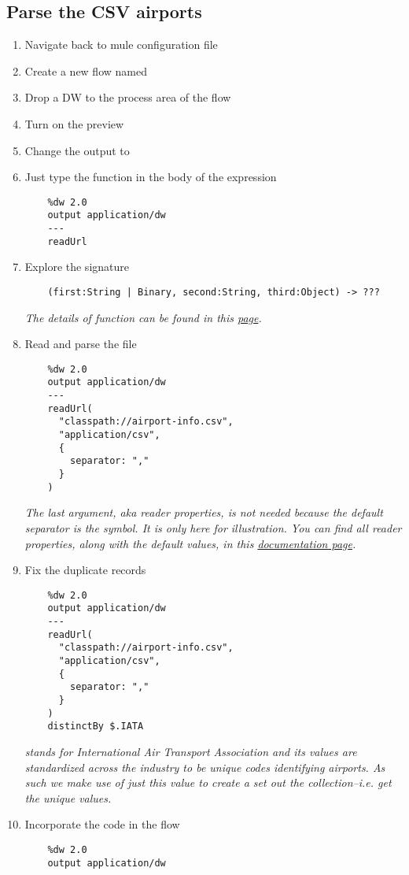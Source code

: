 \subsection{Parse the CSV airports}
\begin{enumerate}[resume*]
\item Navigate back to  mule configuration file
\item Create a new flow named 
\item Drop a DW to the process area of the flow
\item Turn on the preview
\item Change the output to 
\item Just type the function  in the body of the expression
  \begin{verbatim}
    %dw 2.0
    output application/dw
    ---
    readUrl
  \end{verbatim}
\item Explore the signature
  \begin{verbatim}
    (first:String | Binary, second:String, third:Object) -> ???
  \end{verbatim}
  \emph{
    The details of  function can be found in this \href{https://docs.mulesoft.com/mule-runtime/4.3/dw-core-functions-readurl}{page}.
  }
\item Read and parse the file
  \begin{verbatim}
    %dw 2.0
    output application/dw
    ---
    readUrl(
      "classpath://airport-info.csv",
      "application/csv",
      {
        separator: ","
      }
    )
  \end{verbatim}
  \emph{
    The last argument, aka reader properties, is not needed because the default separator is the \ttt{,} symbol.  It is only here for illustration.  You can find all reader properties, along with the default values, in this \href{https://docs.mulesoft.com/mule-runtime/4.3/dataweave-formats-csv\#reader-properties}{documentation page}.
  }
\item Fix the duplicate records
  \begin{verbatim}
    %dw 2.0
    output application/dw
    ---
    readUrl(
      "classpath://airport-info.csv",
      "application/csv",
      {
        separator: ","
      }
    )
    distinctBy $.IATA
  \end{verbatim}
  \emph{
     stands for International Air Transport Association and its values are standardized across the industry to be unique codes identifying airports.  As such we make use of just this value to create a set out the collection--i.e. get the unique values.
  }
\item Incorporate the code in the  flow
  \begin{verbatim}
    %dw 2.0
    output application/dw


\end{verbatim}
\end{enumerate}
